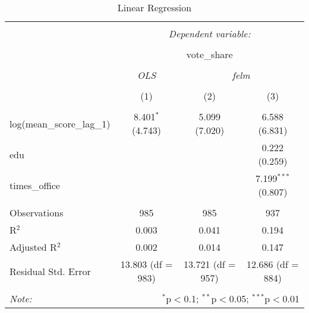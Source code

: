 \documentclass[12pt,]{book}
\begin{document}
\begin{table}[!htbp] \centering 
  \caption{Linear Regression} 
  \label{} 
\begin{tabular}{@{\extracolsep{5pt}}lccc} 
\\[-1.8ex]\hline 
\hline \\[-1.8ex] 
 & \multicolumn{3}{c}{\textit{Dependent variable:}} \\ 
\cline{2-4} 
\\[-1.8ex] & \multicolumn{3}{c}{vote\_share} \\ 
\\[-1.8ex] & \textit{OLS} & \multicolumn{2}{c}{\textit{felm}} \\ 
\\[-1.8ex] & (1) & (2) & (3)\\ 
\hline \\[-1.8ex] 
 log(mean\_score\_lag\_1) & 8.401$^{*}$ (4.743) & 5.099 (7.020) & 6.588 (6.831) \\ 
  edu &  &  & 0.222 (0.259) \\ 
  times\_office &  &  & 7.199$^{***}$ (0.807) \\ 
 \hline \\[-1.8ex] 
Observations & 985 & 985 & 937 \\ 
R$^{2}$ & 0.003 & 0.041 & 0.194 \\ 
Adjusted R$^{2}$ & 0.002 & 0.014 & 0.147 \\ 
Residual Std. Error & 13.803 (df = 983) & 13.721 (df = 957) & 12.686 (df = 884) \\ 
\hline 
\hline \\[-1.8ex] 
\textit{Note:}  & \multicolumn{3}{r}{$^{*}$p$<$0.1; $^{**}$p$<$0.05; $^{***}$p$<$0.01} \\ 
\end{tabular} 
\end{table}
\end{document}
